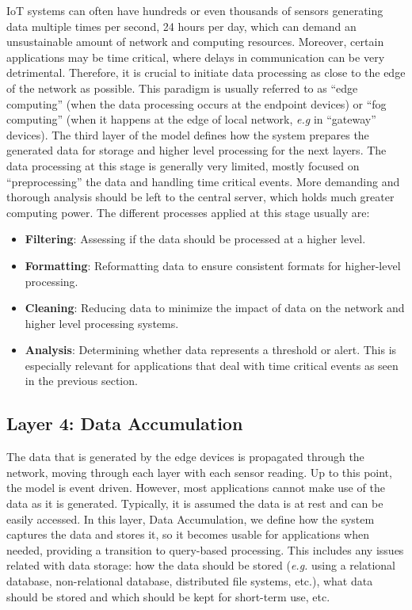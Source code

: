 \acs{IoT} systems can often have hundreds or even thousands of sensors generating data multiple times per second, 24 hours per day, which can demand an unsustainable amount of network and computing resources. Moreover, certain applications may be time critical, where delays in communication can be very detrimental. Therefore, it is crucial to initiate data processing as close to the edge of the network as possible. This paradigm is usually referred to as ``edge computing'' (when the data processing occurs at the endpoint devices) or ``fog computing'' (when it happens at the edge of local network, \textit{e.g} in ``gateway'' devices). The third layer of the model defines how the system prepares the generated data for storage and higher level processing for the next layers. The data processing at this stage is generally very limited, mostly focused on ``preprocessing'' the data and handling time critical events. More demanding and thorough analysis should be left to the central server, which holds much greater computing power. The different processes applied at this stage usually are:

\begin{itemize}
    \item \textbf{Filtering}: Assessing if the data should be processed at a higher level. 
    \item \textbf{Formatting}: Reformatting data to ensure consistent formats for higher-level processing.
    \item \textbf{Cleaning}: Reducing data to minimize the impact of data on the network and higher level processing systems.
    \item \textbf{Analysis}: Determining whether data represents a threshold or alert. This is especially relevant for applications that deal with time critical events as seen in the previous section.
\end{itemize}

\subsection{Layer 4: Data Accumulation}
\label{sec:iot-model-layer4}


The data that is generated by the edge devices is propagated through the network, moving through each layer with each sensor reading. Up to this point, the model is event driven. However, most applications cannot make use of the data as it is generated. Typically, it is assumed the data is at rest and can be easily accessed. In this layer, Data Accumulation, we define how the system captures the data and stores it, so it becomes usable for applications when needed, providing a transition to query-based processing. This includes any issues related with data storage: how the data should be stored (\textit{e.g.} using a relational database, non-relational database, distributed file systems, etc.), what data should be stored and which should be kept for short-term use, etc.

